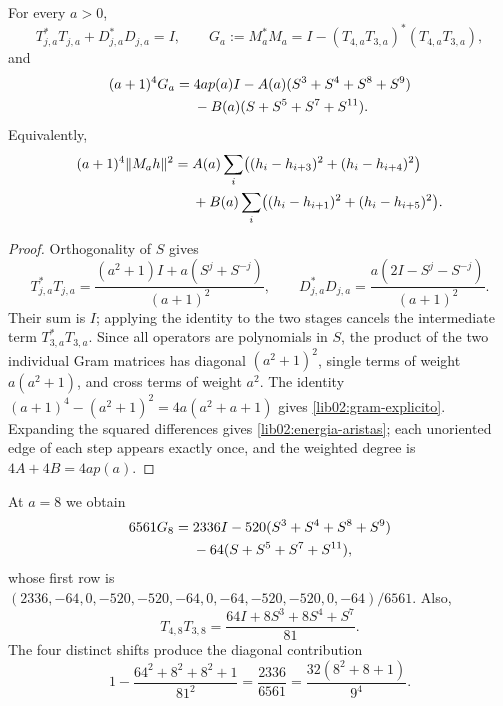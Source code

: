 \begin{proposition}
\label{lib02:gram}
For every \(a>0\),
\[
 T_{j,a}^*T_{j,a}+D_{j,a}^*D_{j,a}=I,\qquad
 G_a:=M_a^*M_a=I-(T_{4,a}T_{3,a})^*(T_{4,a}T_{3,a}),
\]
and
\begin{align}
 (a+1)^4G_a={}&4ap(a)I
 -A(a)(S^3+S^4+S^8+S^9)\notag\\
 &-B(a)(S+S^5+S^7+S^{11}).
 \label{lib02:gram-explicito}
\end{align}
Equivalently,
\begin{align}
 (a+1)^4\|M_ah\|^2={}&A(a)\sum_i
 \bigl((h_i-h_{i+3})^2+(h_i-h_{i+4})^2\bigr)\notag\\
 &+B(a)\sum_i
 \bigl((h_i-h_{i+1})^2+(h_i-h_{i+5})^2\bigr).
 \label{lib02:energia-aristas}
\end{align}
\end{proposition}
\begin{proof}
Orthogonality of \(S\) gives
\[
 T_{j,a}^*T_{j,a}
 =\frac{(a^2+1)I+a(S^j+S^{-j})}{(a+1)^2},\qquad
 D_{j,a}^*D_{j,a}
 =\frac{a(2I-S^j-S^{-j})}{(a+1)^2}.
\]
Their sum is \(I\); applying the identity to the two stages cancels the intermediate term \(T_{3,a}^*T_{3,a}\). Since all operators are polynomials in \(S\), the product of the two individual Gram matrices has diagonal \((a^2+1)^2\), single terms of weight \(a(a^2+1)\), and cross terms of weight \(a^2\). The identity \((a+1)^4-(a^2+1)^2=4a(a^2+a+1)\) gives \eqref{lib02:gram-explicito}. Expanding the squared differences gives \eqref{lib02:energia-aristas}; each unoriented edge of each step appears exactly once, and the weighted degree is \(4A+4B=4ap(a)\).
\end{proof}

At \(a=8\) we obtain
\begin{align}
 6561G_8={}&2336I-520(S^3+S^4+S^8+S^9)\notag\\
 &-64(S+S^5+S^7+S^{11}),
 \label{lib02:gram-nonadico}
\end{align}
whose first row is \((2336,-64,0,-520,-520,-64,0,-64,-520,-520,0,-64)/6561\). Also,
\[
 T_{4,8}T_{3,8}=\frac{64I+8S^3+8S^4+S^7}{81}.
\]
The four distinct shifts produce the diagonal contribution
\[
 1-\frac{64^2+8^2+8^2+1}{81^2}
 =\frac{2336}{6561}
 =\frac{32(8^2+8+1)}{9^4}.
\]

